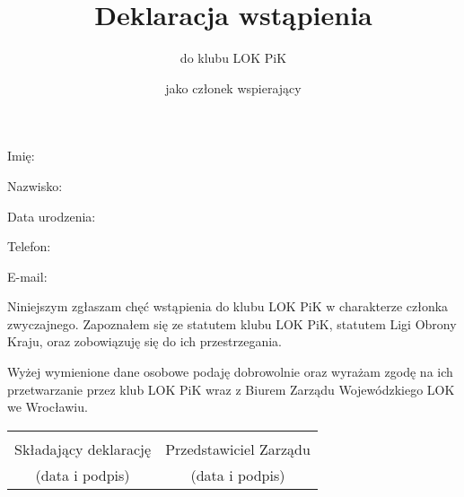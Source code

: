 \documentclass[a4paper,12pt]{article}
\title{Deklaracja wstąpienia}
\author{do klubu LOK PiK}
\date{jako członek wspierający}
\begin{document}
\maketitle
\thispagestyle{empty} %
Imię: \dotfill
\vspace{1em}

Nazwisko: \dotfill
\vspace{1em}

Data urodzenia: \dotfill
\vspace{1em}

Telefon: \dotfill
\vspace{1em}

E-mail: \dotfill
\vspace{1em}

Niniejszym zgłaszam chęć wstąpienia do klubu LOK PiK w charakterze członka zwyczajnego. Zapoznałem się ze statutem klubu LOK PiK, statutem Ligi Obrony Kraju, oraz zobowiązuję się do ich przestrzegania.

Wyżej wymienione dane osobowe podaję dobrowolnie oraz wyrażam zgodę na ich przetwarzanie przez klub LOK PiK wraz z Biurem Zarządu Wojewódzkiego LOK we Wrocławiu.
\vspace{4em}
\begin{center}
	\begin{tabular}{ c c }
		\dotfill & \dotfill \\
		Składający deklarację & Przedstawiciel Zarządu\\
		(data i podpis) & (data i podpis)
	\end{tabular}
\end{center}
\end{document}
